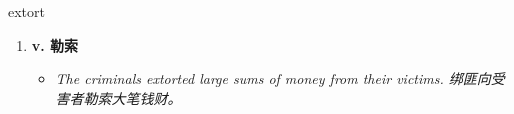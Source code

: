
\begin{frame}
{\huge extort}
\begin{center}
\begin{enumerate}\Large
  \item \textbf{v. 勒索}
  \begin{itemize}
    \item \em{\Large{The criminals extorted large sums of money from their victims. 绑匪向受害者勒索大笔钱财。}}
  \end{itemize}
\end{enumerate}
\end{center}
\end{frame}
